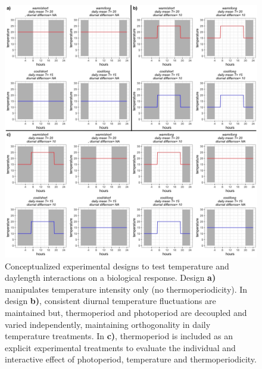\documentclass[11pt]{article}
\begin{document}
\begin{figure}[h!]
    \centering
 \includegraphics[width=\textwidth]{..//Plots/periodicity_figures/designs.jpeg}
    \caption{Conceptualized experimental designs to test temperature and daylength interactions on a biological response. Design \textbf{a)}  manipulates temperature intensity only (no thermoperiodicity). In design \textbf{b)}, consistent diurnal temperature fluctuations are maintained but, thermoperiod and photoperiod are decoupled and varied independently, maintaining orthogonality in daily temperature treatments. In \textbf{c)}, thermoperiod is included as an explicit experimental treatments to evaluate the individual and interactive effect of photoperiod, temperature and thermoperiodicity.}
    \label{fig:designs}
\end{figure}
 
\end{document}
